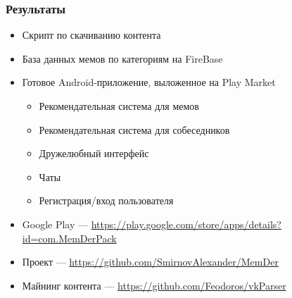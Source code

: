 \documentclass[xetex,mathserif,serif, xcolor=table]{beamer}
\begin{document}
	\begin{frame}
		\frametitle{Результаты}
		\begin{itemize}
		    \item Скрипт по скачиванию контента
			\item База данных мемов по категориям на FireBase
			\item Готовое Android-приложение, выложенное на Play Market
		    	\begin{itemize}
			    	\item Рекомендательная система для мемов
			    	\item Рекомендательная система для собеседников
			    	\item Дружелюбный интерфейс
			    	\item Чаты
			    	\item Регистрация/вход пользователя
			   	\end{itemize}
			\item Google Play — \url{https://play.google.com/store/apps/details?id=com.MemDerPack}
			\item Проект — \url{https://github.com/SmirnovAlexander/MemDer}
			\item Майнинг контента — \url{https://github.com/Feodoros/vkParser}
		\end{itemize}
	\end{frame}
\end{document}
